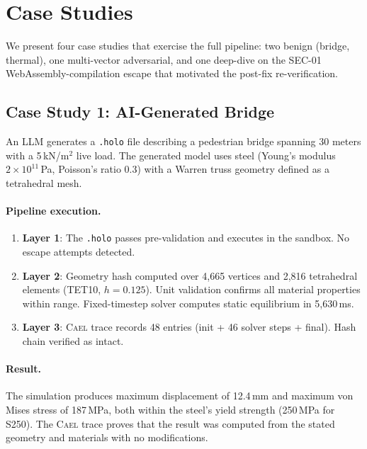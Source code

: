 \documentclass[letterpaper,twocolumn,10pt]{article}
\newcommand{\cael}{\textsc{Cael}}
\begin{document}

\section{Case Studies}
\label{sec:casestudies}

We present four case studies that exercise the full pipeline: two
benign (bridge, thermal), one multi-vector adversarial, and one
deep-dive on the SEC-01 WebAssembly-compilation escape that
motivated the post-fix re-verification.

\subsection{Case Study 1: AI-Generated Bridge}

An LLM generates a \texttt{.holo} file describing a pedestrian bridge
spanning 30 meters with a 5\,kN/m$^2$ live load. The generated model
uses steel (Young's modulus $2 \times 10^{11}$\,Pa, Poisson's ratio 0.3)
with a Warren truss geometry defined as a tetrahedral mesh.

\paragraph{Pipeline execution.}
\begin{enumerate}[leftmargin=*,topsep=2pt,itemsep=1pt]
  \item \textbf{Layer 1}: The \texttt{.holo} passes pre-validation and
    executes in the sandbox. No escape attempts detected.
  \item \textbf{Layer 2}: Geometry hash computed over
    4{,}665 vertices and 2{,}816 tetrahedral elements (TET10, $h{=}0.125$).
    Unit validation confirms all material properties within range.
    Fixed-timestep solver computes static equilibrium in 5{,}630\,ms.
  \item \textbf{Layer 3}: \cael{} trace records 48 entries
    (init + 46 solver steps + final). Hash chain verified as intact.
\end{enumerate}

\paragraph{Result.} The simulation produces maximum displacement of
12.4\,mm and maximum von Mises stress of 187\,MPa, both
within the steel's yield strength (250\,MPa for S250). The \cael{} trace proves that the
result was computed from the stated geometry and materials with no
modifications.
\end{document}

